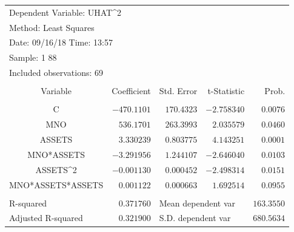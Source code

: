 \documentclass[12pt]{report}
\begin{document}
\begin{table}[H]
	\centering
	\begin{tabular}{lrrrr}
		\multicolumn{3}{l}{Dependent Variable: UHAT\textasciicircum 2}&\multicolumn{1}{c}{}&\multicolumn{1}{c}{}\\
		\multicolumn{3}{l}{Method: Least Squares}&\multicolumn{1}{c}{}&\multicolumn{1}{c}{}\\
		\multicolumn{3}{l}{Date: 09/16/18   Time: 13:57}&\multicolumn{1}{c}{}&\multicolumn{1}{c}{}\\
		\multicolumn{2}{l}{Sample: 1 88}&\multicolumn{1}{c}{}&\multicolumn{1}{c}{}&\multicolumn{1}{c}{}\\
		\multicolumn{3}{l}{Included observations: 69}&\multicolumn{1}{c}{}&\multicolumn{1}{c}{}\\
		[4.5pt] \hline \\ [-4.5pt]
		\multicolumn{1}{c}{Variable}&\multicolumn{1}{r}{Coefficient}&\multicolumn{1}{r}{Std. Error}&\multicolumn{1}{r}{t-Statistic}&\multicolumn{1}{r}{Prob.}\\
		[4.5pt] \hline \\ [-4.5pt]
		\multicolumn{1}{c}{C}&\multicolumn{1}{r}{$-470.1101$}&\multicolumn{1}{r}{$170.4323$}&\multicolumn{1}{r}{$-2.758340$}&\multicolumn{1}{r}{$0.0076$}\\
		\multicolumn{1}{c}{MNO}&\multicolumn{1}{r}{$536.1701$}&\multicolumn{1}{r}{$263.3993$}&\multicolumn{1}{r}{$2.035579$}&\multicolumn{1}{r}{$0.0460$}\\
		\multicolumn{1}{c}{ASSETS}&\multicolumn{1}{r}{$3.330239$}&\multicolumn{1}{r}{$0.803775$}&\multicolumn{1}{r}{$4.143251$}&\multicolumn{1}{r}{$0.0001$}\\
		\multicolumn{1}{c}{MNO*ASSETS}&\multicolumn{1}{r}{$-3.291956$}&\multicolumn{1}{r}{$1.244107$}&\multicolumn{1}{r}{$-2.646040$}&\multicolumn{1}{r}{$0.0103$}\\
		\multicolumn{1}{c}{ASSETS\textasciicircum 2}&\multicolumn{1}{r}{$-0.001130$}&\multicolumn{1}{r}{$0.000452$}&\multicolumn{1}{r}{$-2.498314$}&\multicolumn{1}{r}{$0.0151$}\\
		\multicolumn{1}{c}{MNO*ASSETS*ASSETS}&\multicolumn{1}{r}{$0.001122$}&\multicolumn{1}{r}{$0.000663$}&\multicolumn{1}{r}{$1.692514$}&\multicolumn{1}{r}{$0.0955$}\\
		[4.5pt] \hline \\ [-4.5pt]
		\multicolumn{1}{l}{R-squared}&\multicolumn{1}{r}{$0.371760$}&\multicolumn{2}{l}{Mean dependent var}&\multicolumn{1}{r}{$163.3550$}\\
		\multicolumn{1}{l}{Adjusted R-squared}&\multicolumn{1}{r}{$0.321900$}&\multicolumn{2}{l}{S.D. dependent var}&\multicolumn{1}{r}{$680.5634$}\\

\end{tabular}
\end{table}
\end{document}
